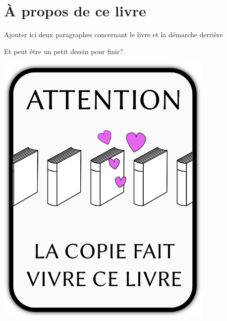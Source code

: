 \chapter*{À propos de ce livre}
\thispagestyle{empty}
\renewcommand{\chaptermark}{À propos de ce livre}

Ajouter ici deux paragraphes concernant le livre et la démarche derrière

\vspace{2em}
Et peut être un petit dessin pour finir?

\begin{center}
	\includegraphics{images/photocopillage.png}
\end{center}

